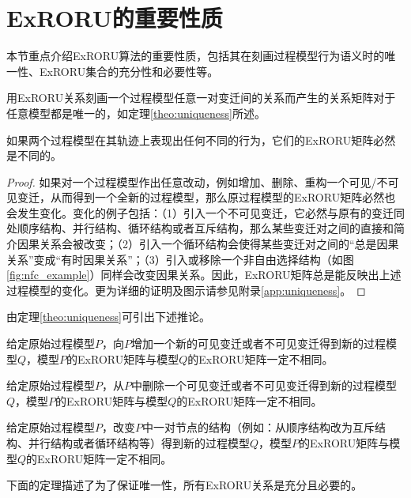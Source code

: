 \section{ExRORU的重要性质}\label{sec:exroru_properties}
本节重点介绍ExRORU算法的重要性质，包括其在刻画过程模型行为语义时的唯一性、ExRORU集合的充分性和必要性等。

用ExRORU关系刻画一个过程模型任意一对变迁间的关系而产生的关系矩阵对于任意模型都是唯一的，如定理\ref{theo:uniqueness}所述。

\begin{theorem}[唯一性]\label{theo:uniqueness}
如果两个过程模型在其轨迹上表现出任何不同的行为，它们的ExRORU矩阵必然是不同的。
\end{theorem}

\begin{proof}
如果对一个过程模型作出任意改动，例如增加、删除、重构一个可见/不可见变迁，从而得到一个全新的过程模型，那么原过程模型的ExRORU矩阵必然也会发生变化。变化的例子包括：（1）引入一个不可见变迁，它必然与原有的变迁同处顺序结构、并行结构、循环结构或者互斥结构，那么某些变迁对之间的直接和简介因果关系会被改变；（2）引入一个循环结构会使得某些变迁对之间的“总是因果关系”变成“有时因果关系”；（3）引入或移除一个非自由选择结构（如图\ref{fig:nfc_example}）同样会改变因果关系。因此，ExRORU矩阵总是能反映出上述过程模型的变化。更为详细的证明及图示请参见附录\ref{app:uniqueness}。
\end{proof}

由定理\ref{theo:uniqueness}可引出下述推论。

\begin{corollary}\label{cor:add_visible_transition}
给定原始过程模型$P$，向$P$增加一个新的可见变迁或者不可见变迁得到新的过程模型$Q$，模型$P$的ExRORU矩阵与模型$Q$的ExRORU矩阵一定不相同。
\end{corollary}

\begin{corollary}\label{cor:remove_visible_transition}
给定原始过程模型$P$，从$P$中删除一个可见变迁或者不可见变迁得到新的过程模型$Q$，模型$P$的ExRORU矩阵与模型$Q$的ExRORU矩阵一定不相同。
\end{corollary}

\begin{corollary}\label{cor:change_structure}
给定原始过程模型$P$，改变$P$中一对节点的结构（例如：从顺序结构改为互斥结构、并行结构或者循环结构等）得到新的过程模型$Q$，模型$P$的ExRORU矩阵与模型$Q$的ExRORU矩阵一定不相同。
\end{corollary}

下面的定理描述了为了保证唯一性，所有ExRORU关系是充分且必要的。

